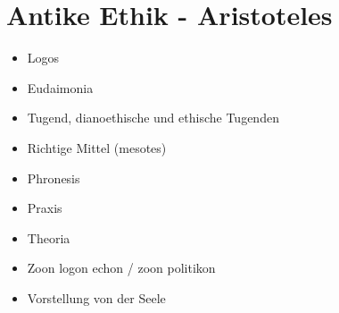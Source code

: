 
\section{Antike Ethik - Aristoteles}

\begin{itemize}
    \item Logos
    \item Eudaimonia
    \item Tugend, dianoethische und ethische Tugenden
    \item Richtige Mittel (mesotes)
    \item Phronesis
    \item Praxis
    \item Theoria
    \item Zoon logon echon / zoon politikon
    \item Vorstellung von der Seele
\end{itemize}
